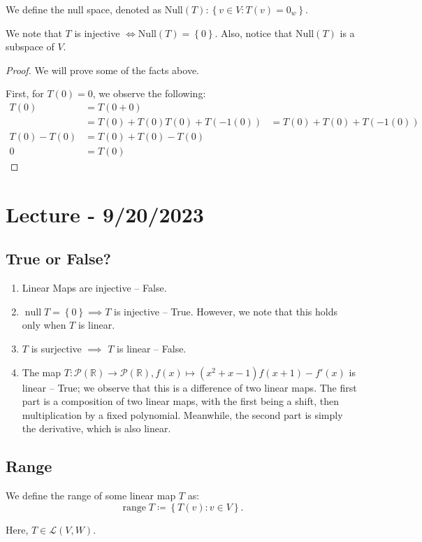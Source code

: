 \documentclass[openany]{book}
\newcommand{\RR}{\mathbb{R}}
\DeclareMathOperator*{\vnull}{null}
\DeclareMathOperator*{\vrange}{range}
\begin{document}
\begin{defn}
	We define the null space, denoted as $\mathrm{Null} (T) : \left\{  v \in V : T(v) = 0 _{w} \right\}$.
\end{defn}

We note that $T$ is injective $\iff \mathrm{Null}(T) = \left\{  0\right\}$. Also, notice that $\mathrm{Null}(T)$ is a subspace of $V$.
\begin{proof}
	We will prove some of the facts above.
	
	First, for $T(0) = 0$, we observe the following:
	\begin{align*}
		T(0) &= T(0+0) \\
		&= T(0) + T(0)
		T(0) + T(-1(0)) &= T(0) + T(0) + T(-1(0)) \\
		T(0) - T(0) &= T(0) + T(0) - T(0) \\
		0 &= T(0)
	\end{align*}
\end{proof}

\section{Lecture - 9/20/2023}
\subsection{True or False?}
\begin{enumerate}
	\item Linear Maps are injective -- False.
	
	\item $\vnull T = \left\{  0 \right\} \implies T$ is injective -- True. However, we note that this holds only when $T$ is linear.
	
	\item $T$ is surjective $\implies$ $T$ is linear -- False.
	
	\item The map $T : \mathscr{P}(\RR) \rightarrow \mathscr{P}(\RR), f(x) \mapsto (x^{2} + x - 1)f(x+1) - f'(x)$ is linear -- True; we observe that this is a difference of two linear maps. The first part is a composition of two linear maps, with the first being a shift, then multiplication by a fixed polynomial. Meanwhile, the second part is simply the derivative, which is also linear.
\end{enumerate}

\subsection{Range}
\begin{defn}[Range]
	We define the range of some linear map $T$ as:
	\begin{equation*}
		\vrange T \coloneq \left\{   T(v) : v \in V \right\}.
	\end{equation*}

	Here, $T \in \mathcal L(V,W)$.
\end{defn}
\end{document}
